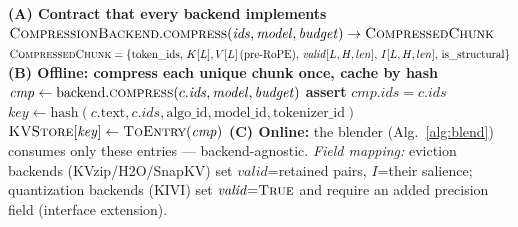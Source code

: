 \begin{algorithm}[t]
\caption{Compression-Backend Integration}\label{alg:backend}
\begin{algorithmic}[1]
\Statex \textbf{(A) Contract that every backend implements}
\Statex \quad $\textsc{CompressionBackend}.\textsc{compress}(\mathit{ids},\mathit{model},\mathit{budget})\rightarrow\textsc{CompressedChunk}$
\Statex \quad $\textsc{CompressedChunk}=\{\text{token\_ids},\,K[L],V[L]\,(\text{pre-RoPE}),\,\mathit{valid}[L,H,len],\,I[L,H,len],\,\text{is\_structural}\}$
\Statex \textbf{(B) Offline: compress each unique chunk once, cache by hash}
  \State $\mathit{cmp}\gets\text{backend}.\textsc{compress}(c.\mathit{ids},\mathit{model},\mathit{budget})$
  \State \textbf{assert} $\mathit{cmp}.\mathit{ids}=c.\mathit{ids}$ 
  \State $\mathit{key}\gets\mathrm{hash}(c.\text{text},c.\mathit{ids},\text{algo\_id},\text{model\_id},\text{tokenizer\_id})$
  \State $\textsc{KVStore}[\mathit{key}]\gets\textsc{ToEntry}(\mathit{cmp})$ 
\EndFor
\Statex \textbf{(C) Online:} the blender (Alg.~\ref{alg:blend}) consumes only these entries --- backend-agnostic.
\Statex \textit{Field mapping:} eviction backends (KVzip/H2O/SnapKV) set $\mathit{valid}$=retained pairs, $I$=their salience;
\Statex \quad quantization backends (KIVI) set $\mathit{valid}{=}\textsc{True}$ and require an added precision field (interface extension).
\end{algorithmic}
\end{algorithm}
